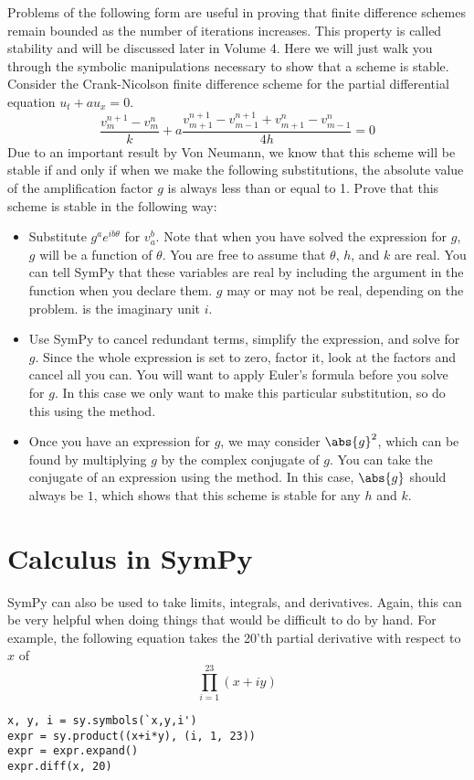 \begin{problem}
Problems of the following form are useful in proving that finite difference schemes remain bounded as the number of iterations increases.
This property is called stability and will be discussed later in Volume 4.
Here we will just walk you through the symbolic manipulations necessary to show that a scheme is stable.
Consider the Crank-Nicolson finite difference scheme for the partial differential equation $u_t+a u_x=0$.
\begin{equation*}
\frac{v_{m}^{n+1}-v_{m}^{n}}{k}+a \frac{v_{m+1}^{n+1}-v_{m-1}^{n+1}+v_{m+1}^{n}-v_{m-1}^{n}}{4h}=0
\end{equation*}
Due to an important result by Von Neumann, we know that this scheme will be stable if and only if when we make the following substitutions, the absolute value of the amplification factor $g$ is always less than or equal to 1.
Prove that this scheme is stable in the following way:
\begin{itemize}
\item Substitute $g^a e^{i b \theta}$ for $v_a^b$.
Note that when you have solved the expression for $g$, $g$ will be a function of $\theta$.
You are free to assume that $\theta$, $h$, and $k$ are real.
You can tell SymPy that these variables are real by including the argument  in the  function when you declare them.
$g$ may or may not be real, depending on the problem.
 is the imaginary unit $i$.
\item Use SymPy to cancel redundant terms, simplify the expression, and solve for $g$.
Since the whole expression is set to zero, factor it, look at the factors and cancel all you can.
You will want to apply Euler's formula before you solve for $g$.
In this case we only want to make this particular substitution, so do this using the  method.
\item Once you have an expression for $g$, we may consider $\abs{g}^2$, which can be found by multiplying $g$ by the complex conjugate of $g$. 
You can take the conjugate of an expression using the  method.
In this case, $\abs{g}$ should always be $1$, which shows that this scheme is stable for any $h$ and $k$.
\end{itemize}
\end{problem}

\section*{Calculus in SymPy}
SymPy can also be used to take limits, integrals, and derivatives.
Again, this can be very helpful when doing things that would be difficult to do by hand.
For example, the following equation takes the 20'th partial derivative with respect to $x$ of 
\begin{equation*}
\prod_{i=1}^{23} \left(x+i y\right)
\end{equation*}
\begin{lstlisting}
x, y, i = sy.symbols(`x,y,i')
expr = sy.product((x+i*y), (i, 1, 23))
expr = expr.expand()
expr.diff(x, 20)
\end{lstlisting}


